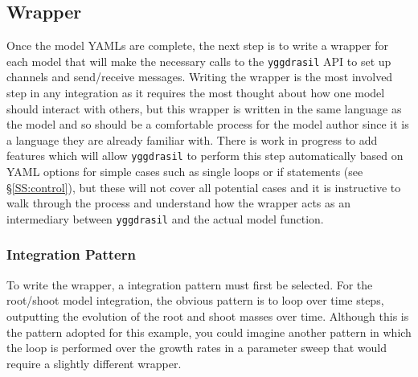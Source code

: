 \documentclass[journal]{IEEEtran}
\newcommand{\pkg}{{\tt yggdrasil}{}}
\begin{document}
\subsection{Wrapper}\label{SS:wrapper}
%
Once the model YAMLs are complete, the next step is to write a wrapper for each model that will make the necessary calls to the {\pkg} API to set up channels and send/receive messages. Writing the wrapper is the most involved step in any integration as it requires the most thought about how one model should interact with others, but this wrapper is written in the same language as the model and so should be a comfortable process for the model author since it is a language they are already familiar with. There is work in progress to add features which will allow {\pkg} to perform this step automatically based on YAML options for simple cases such as single loops or if statements (see \S\ref{SS:control}), but these will not cover all potential cases and it is instructive to walk through the process and understand how the wrapper acts as an intermediary between {\pkg} and the actual model function.

\subsubsection{Integration Pattern}
%
To write the wrapper, a integration pattern must first be selected. For the root/shoot model integration, the obvious pattern is to loop over time steps, outputting the evolution of the root and shoot masses over time. Although this is the pattern adopted for this example, you could imagine another pattern in which the loop is performed over the growth rates in a parameter sweep that would require a slightly different wrapper.
\end{document}
